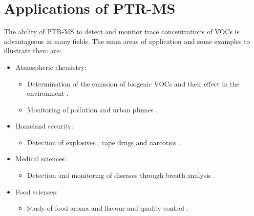 \section{Applications of PTR-MS}
The ability of PTR-MS to detect and monitor trace concentrations of VOCs is advantageous in many fields. The main areas of application and some examples to illustrate them are:
\begin{itemize}
\item Atmospheric chemistry: 
\begin{itemize}
\item Determination of the emission of biogenic VOCs and their effect in the environment \cite{doi:10.1029/2003JD003863}.
\item Monitoring of pollution and urban plumes \cite{ROGERS200626}.
\end{itemize}
\item Homeland security:
\begin{itemize}
\item Detection of explosives \cite{GONZALEZMENDEZ201513,RN1254}, rape drugs \cite{doi:10.1002/jms.2993} and narcotics \cite{Agarwal2011}.
\end{itemize}
\item Medical sciences:
\begin{itemize}
\item Detection and monitoring of diseases through breath analysis \cite{FERNANDEZDELRIO20151243,doi:10.1152/jappl.2001.91.2.762,amann2014}.
\end{itemize}
\item Food sciences:
\begin{itemize}
\item Study of food aroma and flavour and quality control \cite{doi:10.1021/jf020922g,doi:10.1021/jf803998c,doi:10.1002/jms.1797}.
\end{itemize}
\end{itemize}




